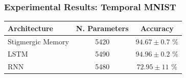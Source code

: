 \documentclass{beamer}
\begin{document}
\begin{frame}
    \frametitle{Experimental Results: Temporal MNIST}
    \begin{table}
        \begin{tabular}{l | c | c}
            Architecture & N. Parameters & Accuracy \\
            \hline
            Stigmergic Memory & 5420 & $94.67 \pm 0.7$ \% \\
            LSTM & 5490 & $94.96 \pm 0.2$ \% \\
            RNN & 5480 & $72.95 \pm 11$ \% \\
        \end{tabular}
    \end{table}
\end{frame}
\end{document}
